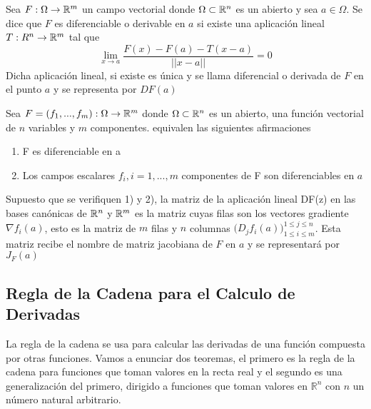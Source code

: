     \begin{definicion}
    Sea $F:\Omega \to \mathbb{R}^m$ un campo vectorial donde $\Omega \subset \mathbb{R}^n$ es un abierto y sea $a \in \Omega$. Se dice que $F$ es diferenciable o derivable en $a$ si existe una aplicación lineal $T:\\R^n \to \mathbb{R}^m$ tal que
    \begin{equation}
        \underset{x \to a}{\lim} \frac{F(x) - F(a) - T(x - a)}{||x - a||} = 0
    \end{equation}
    \noindent Dicha aplicación lineal, si existe es única y se llama diferencial o derivada de $F$ en el punto $a$ y se representa por $DF(a)$
    \end{definicion}
    
    \begin{proposicion}
    Sea $F = (f_1,...,f_m): \Omega \to \mathbb{R}^m$ donde $\Omega \subset \mathbb{R}^n$ es un abierto, una función vectorial de $n$ variables y $m$ componentes. equivalen las siguientes afirmaciones
    \begin{enumerate}
    \item F es diferenciable en a
    \item Los campos escalares $f_i, i=1,...,m$ componentes de F son diferenciables en $a$    
    \end{enumerate}
    \end{proposicion}
    
    Supuesto que se verifiquen 1) y 2), la matriz de la aplicación lineal DF(z) en las bases canónicas de $\mathbb{R}^n$ y $\mathbb{R}^m$ es la matriz cuyas filas son los vectores gradiente $\nabla f_i(a)$, esto es la matriz de $m$ filas y $n$ columnas $\Big(D_j f_i(a)\Big)_{1 \leq i \leq m}^{1 \leq j \leq n}$. Esta matriz recibe el nombre de matriz jacobiana de $F$ en $a$ y se representará por $J_F(a)$

\subsection{Regla de la Cadena para el Calculo de Derivadas}
    
    La regla de la cadena se usa para calcular las derivadas de una función compuesta por otras funciones. Vamos a enunciar dos teoremas, el primero es la regla de la cadena para funciones que toman valores en la recta real y el segundo es una generalización del primero, dirigido a funciones que toman valores en $\mathbb{R}^n$ con $n$ un número natural arbitrario. 
        
